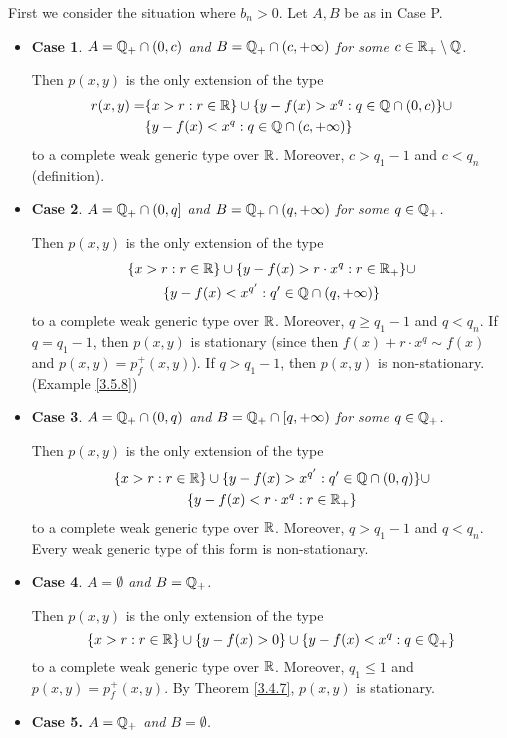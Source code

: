 \documentclass[11pt]{article}
\begin{document}
\begin{itemize}
First we consider the situation where \(b_n>0\). Let \(A,B\) be as in Case P.
\begin{itemize}
\item \textbf{Case 1}. \emph{\(A=\mathbb{Q}_+\cap(0,c)\) and \(B=\mathbb{Q}_+\cap(c,+\infty)\) for some \(c\in\mathbb{R}_+\setminus\mathbb{Q}\).}

Then \(p(x,y)\) is the only extension of the type
\begin{align*}
r(x,y)=&\{x>r:r\in\mathbb{R}\}\cup\{y-f(x)>x^q:q\in\mathbb{Q}\cap(0,c)\}\cup\\
&\{y-f(x)<x^q:q\in\mathbb{Q}\cap(c,+\infty)\}
\end{align*}
to a complete weak generic type over \(\mathbb{R}\). Moreover, \(c>q_1-1\) and \(c<q_n\) (definition).
\label{Problem8}
\item \textbf{Case 2}. \emph{\(A=\mathbb{Q}_+\cap(0,q]\) and \(B=\mathbb{Q}_+\cap(q,+\infty)\) for some \(q\in\mathbb{Q}_+\).}

Then \(p(x,y)\) is the only extension of the type
\begin{gather*}
\{x>r:r\in\mathbb{R}\}\cup\{y-f(x)>r\cdot x^q:r\in\mathbb{R}_+\}\cup\\
\{y-f(x)<x^{q'}:q'\in\mathbb{Q}\cap(q,+\infty)\}
\end{gather*}
to a complete weak generic type over \(\mathbb{R}\). Moreover, \(q\ge q_1-1\)
and \(q<q_n\).
If \(q=q_1-1\), then \(p(x,y)\) is stationary (since then \(f(x)+r\cdot x^q\sim f(x)\) and
\(p(x,y)=p_f^+(x,y)\)).
If \(q>q_1-1\), then \(p(x,y)\) is non-stationary. (Example \ref{3.5.8})
\item \textbf{Case 3}. \emph{\(A=\mathbb{Q}_+\cap(0,q)\) and \(B=\mathbb{Q}_+\cap[q,+\infty)\) for some \(q\in\mathbb{Q}_+\).}

Then \(p(x,y)\) is the only extension of the type
\begin{gather*}
\{x>r:r\in\mathbb{R}\}\cup\{y-f(x)>x^{q'}:q'\in\mathbb{Q}\cap(0,q)\}\cup\\
\{y-f(x)<r\cdot x^q:r\in\mathbb{R}_+\}
\end{gather*}
to a complete weak generic type over \(\mathbb{R}\). Moreover, \(q>q_1-1\) and \(q<q_n\). Every weak
generic type of this form is non-stationary.
\item \textbf{Case 4}. \emph{\(A=\emptyset\) and \(B=\mathbb{Q}_+\).}

Then \(p(x,y)\) is the only extension of the type
\begin{equation*}
\{x>r:r\in\mathbb{R}\}\cup\{y-f(x)>0\}\cup\{y-f(x)<x^q:q\in\mathbb{Q}_+\}
\end{equation*}
to a complete weak generic type over \(\mathbb{R}\). Moreover, \(q_1\le 1\) and \(p(x,y)=p_f^+(x,y)\). By
Theorem \ref{3.4.7}, \(p(x,y)\) is stationary.
\item \textbf{Case 5.} \emph{\(A=\mathbb{Q}_+\) and \(B=\emptyset\).}


\end{itemize}
\end{itemize}
\end{document}
